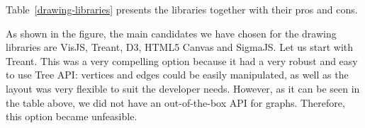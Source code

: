 \documentclass{l4proj}
\begin{document}
Table~\ref{drawing-libraries} presents the libraries together with their pros and cons.

\begin{table}[!ht]
\centering
{}
\caption{Table showing features provided by the main drawing libraries for trees/graphs.}
\label{drawing-libraries}
\end{table}

As shown in the figure, the main candidates we have chosen for the drawing libraries are VisJS, Treant, D3, HTML5 Canvas and SigmaJS. Let us start with Treant. This was a very compelling option because it had a very robust and easy to use Tree API: vertices
and edges could be easily manipulated, as well as the layout was very flexible to suit the developer needs. However, as
it can be seen in the table above, we did not have an out-of-the-box API for graphs. Therefore, this option became unfeasible.
\end{document}
